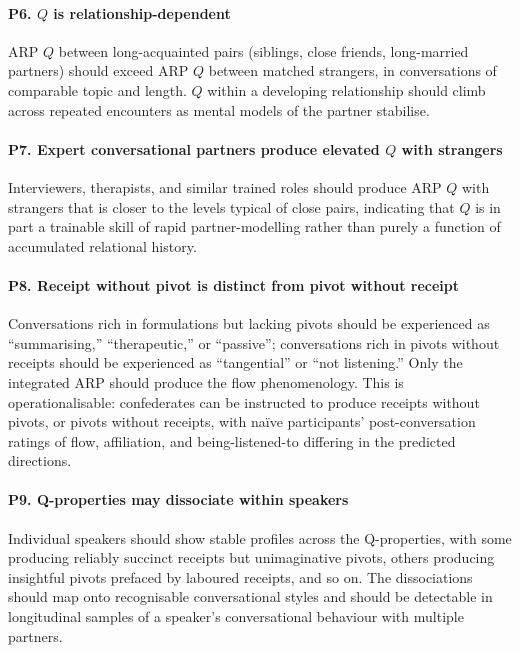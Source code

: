 \paragraph{P6. $Q$ is relationship-dependent} ARP $Q$ between long-acquainted pairs (siblings, close friends, long-married partners) should exceed ARP $Q$ between matched strangers, in conversations of comparable topic and length. $Q$ within a developing relationship should climb across repeated encounters as mental models of the partner stabilise.

\paragraph{P7. Expert conversational partners produce elevated $Q$ with strangers} Interviewers, therapists, and similar trained roles should produce ARP $Q$ with strangers that is closer to the levels typical of close pairs, indicating that $Q$ is in part a trainable skill of rapid partner-modelling rather than purely a function of accumulated relational history.

\paragraph{P8. Receipt without pivot is distinct from pivot without receipt} Conversations rich in formulations but lacking pivots should be experienced as ``summarising,'' ``therapeutic,'' or ``passive''; conversations rich in pivots without receipts should be experienced as ``tangential'' or ``not listening.'' Only the integrated ARP should produce the flow phenomenology. This is operationalisable: confederates can be instructed to produce receipts without pivots, or pivots without receipts, with naïve participants' post-conversation ratings of flow, affiliation, and being-listened-to differing in the predicted directions.

\paragraph{P9. Q-properties may dissociate within speakers} Individual speakers should show stable profiles across the Q-properties, with some producing reliably succinct receipts but unimaginative pivots, others producing insightful pivots prefaced by laboured receipts, and so on. The dissociations should map onto recognisable conversational styles and should be detectable in longitudinal samples of a speaker's conversational behaviour with multiple partners.

